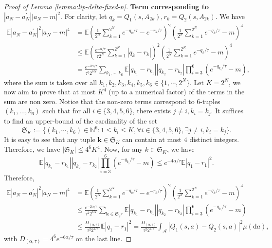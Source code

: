 \documentclass[11pt]{article}
\numberwithin{equation}{section}
\theoremstyle{definition}
\theoremstyle{remark}
\def\diff{{\mathrm{d}}}
\def\N{{\mathbb{N}}}
\begin{document}
\begin{proof}[Proof of Lemma \ref{lemma:lip-delta-fixed-n}]
    \textbf{Term corresponding to $|a_N - a_N^\prime||a_N - m|^2$}.
    For clarity, let $q_k = Q_1(s,A_{2k}), r_k = Q_2(s,A_{2k})$. We have
    \[
        \begin{aligned}
            \mathbb E |a_N - a_N^\prime|^2|a_N - m|^4 & = \mathbb E \left( \frac{1}{2^N}\sum_{k = 1}^{2^N} e^{-q_k / \tau} - e^{-r_k/ \tau} \right)^2 \left( \frac{1}{2^N}\sum_{k = 1}^{2^N} e^{-q_k / \tau} - m \right)^4    \\
            & \leq \mathbb E \left( \frac{e^{-\alpha / \tau}}{\tau 2^N}\sum_{k = 1}^{2^N} |q_k - r_k| \right)^2 \left( \frac{1}{2^N}\sum_{k = 1}^{2^N} e^{-q_k / \tau} - m \right)^4 \\
            & = \frac{e^{-2\alpha / \tau}}{\tau^2 2^{6N}}  \sum_{k_1, \cdots, k_6} \mathbb E |q_{k_1} - r_{k_1}||q_{k_2} - r_{k_2}| \prod_{i = 3}^6 (e^{-q_{k_i} / \tau} - m),
        \end{aligned}
    \]
    where the sum is taken over all $k_1,k_2,k_3,k_4,k_5,k_6 \in \{ 1, \cdots, 2^N\}$. Let $K = 2^N$, we now aim to prove that at most $K^4$ (up to a numerical factor) of the terms in the sum are non zero. Notice that the non-zero terms correspond to $6$-tuples $(k_1, \ldots, k_6)$ such that for all $i \in \{3,4,5,6\}$, there exists $j \neq i, k_i = k_j$.
    It suffices to find an upper-bound of the cardinality of the set
    \[
        \mathfrak S_K := \{(k_1,\cdots, k_6) \in \N^6: 1 \leq k_i \leq K, \forall i \in \{3,4,5,6\}, \exists j \neq i, k_i = k_j \}.
    \]
    It is easy to see that any tuple $\mathbf k \in \mathfrak S_K$ can contain at most $4$ distinct integers. Therefore, we have \(| \mathfrak S _K | \leq 4^6 K^4\).
    Now, for any $k \in \mathfrak S_{K}$, we have
    \[
        \mathbb E |q_{k_1} - r_{k_1}||q_{k_2} - r_{k_2}| \prod_{i = 3}^6 (e^{-q_{k_i} / \tau} - m) \leq e^{-4\alpha/\tau} \mathbb E |q_1 - r_1|^2.
    \]
    Therefore,
    \begin{equation}
        \label{eq:lip-delta-fixed-n-first-bound}
        \begin{aligned}
            \mathbb E |a_N - a_N^\prime|^2|a_N - m|^4 & = \mathbb E \left( \frac{1}{2^N}\sum_{k = 1}^{2^N} e^{-q_k / \tau} - e^{-r_k/ \tau} \right)^2 \left( \frac{1}{2^N}\sum_{k = 1}^{2^N} e^{-q_k / \tau} - m \right)^4            \\
            & \leq \frac{e^{-2\alpha/\tau}}{\tau^2 2^{6N}}  \sum_{\mathbf k \in \mathfrak S_{2^N}} \mathbb E |q_{k_1} - r_{k_1}||q_{k_2} - r_{k_2}| \prod_{i = 3}^6 (e^{-q_{k_i} / \tau} - m) \\
            & \leq \frac{D_{(\alpha,\tau)} }{\tau^2 2^{2N}} \mathbb E |q_1 - r_1|^2 = \frac{D_{(\alpha,\tau)} }{\tau^2 2^{2N}} \int_{\mathcal A} |Q_1(s,a) - Q_2(s,a)|^2 \mu (\diff a),
        \end{aligned}
    \end{equation}
with $D_{(\alpha,\tau)} = 4^6 e^{-6\alpha/\tau}$ on the last line.


\end{proof}
\end{document}
